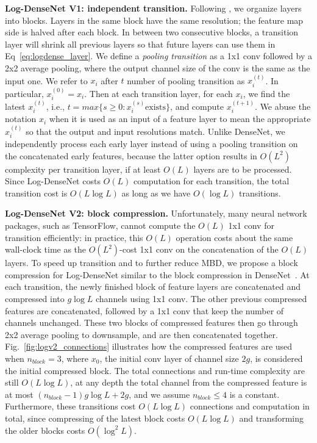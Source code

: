 \documentclass{article}
\newcommand{\logdense}{Log-DenseNet\xspace}
\newcommand{\pbd}{MBD\xspace}
\begin{document}
\textbf{\logdense V1: independent transition.}
Following \cite{densenet}, we organize layers into blocks. Layers in the same block have the same resolution; the feature map side is halved after each block. In between two consecutive blocks, a transition layer will shrink all previous layers so that future layers can use them in Eq~\ref{eq:logdense_layer}. We define a \textit{pooling transition} as a 1x1 conv followed by a 2x2 average pooling, where the output channel size of the conv is the same as the input one. 
We refer to $x_i$ after $t$ number of pooling transition as $x_i^{(t)}$. In particular, $x_i^{(0)} = x_i$. Then at each transition layer, for each $x_i$, we find the latest $x_i^{(t)}$, i.e., $t = max \{ s \geq 0 : x_i^{(s)} \text{exists}\}$, and compute $x_i^{(t+1)}$. 
We abuse the notation $x_i$ when it is used as an input of a feature layer to mean the appropriate $x_i^{(t)}$ so that the output and input resolutions match.
Unlike DenseNet, we independently process each early layer instead of using a pooling transition on the concatenated early features, because the latter option results in $O(L^2)$ complexity per transition layer, if at least $O(L)$ layers are to be processed. Since \logdense costs $O(L)$ computation for each transition, the total transition cost is $O(L\log L)$ as long as we have $O(\log L)$ transitions.


\textbf{\logdense V2: block compression.}
Unfortunately, many neural network packages, such as TensorFlow, cannot compute the $O(L)$ 1x1 conv for transition efficiently: in practice, this $O(L)$ operation costs about the same wall-clock time as the $O(L^2)$-cost 1x1 conv on the concatenation of the $O(L)$ layers.
To speed up transition and to further reduce \pbd, we propose a block compression for \logdense similar to the block compression in DenseNet~\citep{densenet}. At each transition, the newly finished block of feature layers are concatenated and compressed into $g \log L$ channels using 1x1 conv. The other previous compressed features are concatenated, followed by a 1x1 conv that keep the number of channels unchanged. These two blocks of compressed features then go through 2x2 average pooling to downsample, and are then concatenated together. Fig.~\ref{fig:logv2_connections} illustrates how the compressed features are used when $n_{block}=3$, where $x_0$, the initial conv layer of channel size $2g$, is considered the initial compressed block. The total connections and run-time complexity are still $O(L\log L)$, at any depth the total channel from the compressed feature is at most $(n_{block} -1) g \log L + 2g$, and we assume $n_{block} \leq 4$ is a constant. Furthermore, these transitions cost $O(L\log L)$ connections and computation in total, since compressing of the latest block costs $O(L\log L)$ and transforming the older blocks costs $O(\log^2 L)$. 
\end{document}
